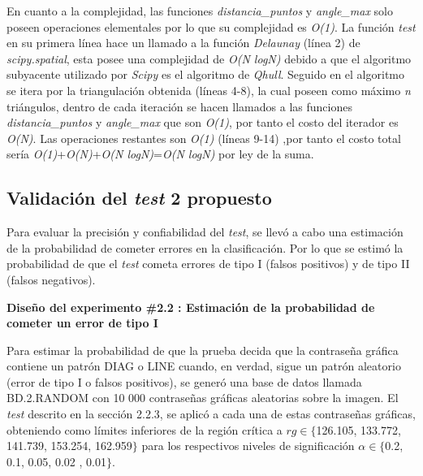 \documentclass[12pt]{report}
\begin{document}
En cuanto a la complejidad, las funciones \textit{distancia\_puntos} y \textit{angle\_max} solo poseen operaciones elementales por lo que su complejidad es \textit{O(1)}. La función \textit{test} en su primera línea hace un llamado a la función  \textit{Delaunay} (línea 2) de \textit{scipy.spatial}, esta posee una complejidad de \textit{O(N logN)} debido a que el algoritmo subyacente utilizado por \textit{Scipy} es el algoritmo de \textit{Qhull}. Seguido en el algoritmo se itera por la triangulación obtenida (líneas 4-8), la cual poseen como máximo \textit{n} triángulos, dentro de cada iteración se hacen llamados a las  funciones \textit{distancia\_puntos} y \textit{angle\_max}  que son \textit{O(1)}, por tanto el costo del iterador es \textit{O(N)}. Las operaciones restantes son \textit{O(1)} (líneas 9-14) ,por tanto el costo total sería \textit{O(1)}+\textit{O(N)}+\textit{O(N logN)}=\textit{O(N logN)} por ley de la suma.

\subsection{Validación del \textit{test} 2 propuesto}
\label{sec:2.4}

Para evaluar la precisión y confiabilidad del \textit{test}, se llevó a cabo una estimación de la probabilidad de cometer errores en la clasificación. Por lo que se estimó la probabilidad de que el \textit{test} cometa  errores de tipo I (falsos positivos) y de tipo II (falsos negativos).

\textbf{Diseño del experimento \#2.2 : Estimación de la probabilidad de cometer un error de tipo I} 

Para estimar la probabilidad de que la prueba decida que la contraseña gráfica contiene un patrón DIAG o LINE cuando, en verdad, sigue un patrón aleatorio (error de tipo I o falsos positivos), se generó una base de datos llamada BD.2.RANDOM con 10 000 contraseñas gráficas aleatorias sobre la imagen. El \textit{test} descrito en la sección 2.2.3, se aplicó a cada una de estas contraseñas gráficas, obteniendo como límites inferiores de la región crítica a  $rg \in \{$126.105, 133.772, 141.739, 153.254, 162.959$\}$ para los respectivos  niveles de significación $\alpha \in \{$0.2, 0.1, 0.05, 0.02 , 0.01$\}$.
\end{document}
